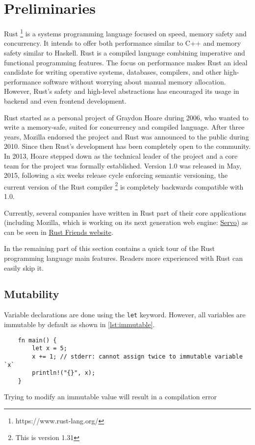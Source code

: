 \chapter{Preliminaries}
\label{chapter:preliminaries}

Rust \footnote{https://www.rust-lang.org/} is a systems programming language focused on speed, memory safety and concurrency. It intends to offer both performance similar to C++ and memory safety similar to Haskell. Rust is a compiled language combining imperative and functional programming features. The focus on performance makes Rust an ideal candidate for writing operative systems, databases, compilers, and other high-performance software without worrying about manual memory allocation. However, Rust's safety and high-level abstractions has encouraged its usage in backend and even frontend development. 

Rust started as a personal project of Graydon Hoare during 2006, who wanted to write a memory-safe, suited for concurrency and compiled language. After three years, Mozilla endorsed the project and Rust was announced to the public during 2010. Since then Rust's development has been completely open to the community. In 2013, Hoare stepped down as the technical leader of the project and a core team for the project was formally established. \cite{steve_acm} Version 1.0 was released in May, 2015, following a six weeks release cycle enforcing semantic versioning, the current version of the Rust compiler \footnote{This is version 1.31} is completely backwards compatible with 1.0.

Currently, several companies have written in Rust part of their core applications (including Mozilla, which is working on its next generation web engine: \href{https://servo.org/}{Servo}) as can be seen in \href{https://www.rust-lang.org/en-US/friends.html}{Rust Friends website}.

In the remaining part of this section contains a quick tour of the Rust programming language main features. Readers more experienced with Rust can easily skip it.

\section{Mutability}
Variable declarations are done using the \texttt{let} keyword. However, all variables are immutable by default as shown in \ref{lst:immutable}.

\begin{listing}[h]
	\begin{verbatim}
    fn main() {
        let x = 5;
        x += 1; // stderr: cannot assign twice to immutable variable `x`
        println!("{}", x);
    }
	\end{verbatim}
  \caption{Trying to modify an immutable value will result in a compilation error}
  \label{lst:immutable}
\end{listing}

